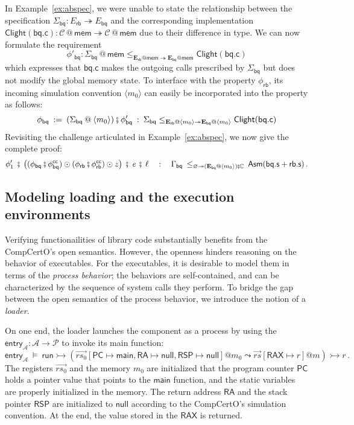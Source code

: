 \documentclass[acmsmall,screen,review,nonacm]{acmart}
\newcommand{\kw}[1]{\ensuremath{ \mathsf{#1} }}
\newcommand{\vcomp}{\fatsemi}
\begin{document}
In Example~\ref{ex:abspec},
we were unable to state the relationship
between the specification
$\Sigma_\kw{bq} : E_\kw{rb} \twoheadrightarrow E_\kw{bq}$
and the corresponding implementation
$\kw{Clight}(\kw{bq.c}) : \mathcal{C} \mathbin@ \kw{mem}
 \twoheadrightarrow \mathcal{C} \mathbin@ \kw{mem}$
due to their difference in type.
We can now formulate the requirement
\[
\phi'_\kw{bq} : \Sigma_\kw{bq} \mathbin@ \kw{mem}
\le_{\mathbf{E}_\kw{rb}@\kw{mem} \twoheadrightarrow \mathbf{E}_\kw{bq}@\kw{mem}}
\kw{Clight}(\kw{bq.c})
\]%
which expresses that $\kw{bq.c}$
makes the outgoing calls prescribed by $\Sigma_\kw{bq}$
but does not modify the global memory state.
To interface with
the property $\phi_\kw{rb}$,
its incoming simulation convention
$\langle m_0 \rangle$
can easily be incorporated into the property
as follows:
\[
  \phi_\kw{bq} \: := \:
    (\Sigma_\kw{bq} \mathbin@ \langle m_0 \rangle)
    \vcomp
    \phi'_\kw{bq}
  \: : \:
  \Sigma_\kw{bq}
    \le_{\mathbf{E}_\kw{rb} \mathbin@ \langle m_0 \rangle
         \twoheadrightarrow
         \mathbf{E}_\kw{bq} \mathbin@ \langle m_0 \rangle}
    \kw{Clight}(\kw{bq.c})
\]
Revisiting the challenge articulated in Example~\ref{ex:abspec},
we now give the complete proof:
\[
  \phi'_1
  \:\vcomp\:
  \big(
  (\phi_\kw{bq} \vcomp \phi^\kw{cc}_\kw{bq}) \odot
  (\phi_\kw{rb} \vcomp \phi^\kw{cc}_\kw{rb}) \odot z
  \big)
  \:\vcomp\:
  \textit{e}
  \:\vcomp\:
  \ell
  \quad : \quad
  \Gamma_\kw{bq}
  \:
  \le_{\varnothing \twoheadrightarrow
       (\mathbf{E}_\kw{bq} \mathbin@ \langle m_0 \rangle) \vcomp \mathbb{C}}
  \:
  \kw{Asm}(\kw{bq.s} + \kw{rb.s})
  \,.
\]

\subsection{Modeling loading and the execution environments}
\label{sec:application:loader}  %

Verifying functionailities
of library code substantially benefits from
the CompCertO's open semantics.
However,
the openness hinders reasoning
on the behavior of executables.
For the executables,
it is desirable to
model them
in terms of the \textit{process behavior};
the behaviors are self-contained,
and can be characterized
by the sequence of system calls
they perform.
To bridge the gap
between the open semantics of
the process behavior,
we introduce the notion of a \textit{loader}.

On one end,
the loader launches
the component as a process
by using the
$\kw{entry}_\mathcal{A} : \mathcal{A} \rightarrow \mathcal{P}$
to invoke its main function:
\[
  \kw{entry}_\mathcal{A} \:\vDash\:
  \kw{run} \rightarrowtail
  (\vec{rs_0}[\kw{PC}\mapsto \kw{main},
  \kw{RA} \mapsto \kw{null},
  \kw{RSP}\mapsto \kw{null}]@m_0 \leadsto
  \vec{rs}[\kw{RAX} \mapsto r]@m) \rightarrowtail r \,.
\]
The registers $\vec{rs_0}$ and the memory $m_0$ are
initialized that
the program counter $\kw{PC}$ holds a pointer value
that points to
the $\kw{main}$ function,
and the static variables
are properly initialized in the memory.
The return address $\kw{RA}$
and the stack pointer $\kw{RSP}$
are initialized to $\kw{null}$
according to the CompCertO's simulation convention.
At the end,
the value stored in the $\kw{RAX}$ is returned.
\end{document}
